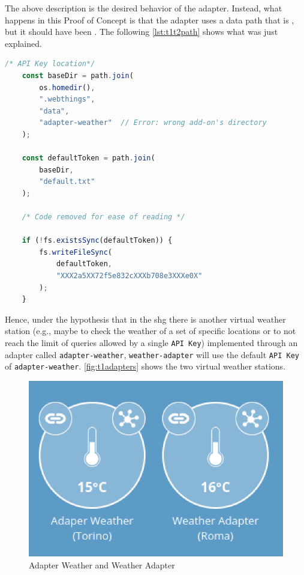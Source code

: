 The above description is the desired behavior of the adapter. Instead, what happens in this Proof of Concept is that the adapter uses a data path that is , but it should have been . The following \autoref{lst:t1t2path} shows what was just explained.

\begin{lstlisting}[language=JavaScript, label=lst:t1t2path, caption=T1 - Wrong data path]
    /* API Key location*/
    const baseDir = path.join(
        os.homedir(),
        ".webthings",
        "data",
        "adapter-weather"  // Error: wrong add-on's directory
    );
    
    const defaultToken = path.join(
        baseDir, 
        "default.txt"
    );
    
    /* Code removed for ease of reading */
    
    if (!fs.existsSync(defaultToken)) {
        fs.writeFileSync(
            defaultToken, 
            "XXX2a5XX72f5e832cXXXb708e3XXXe0X"
        );
    }
\end{lstlisting}


Hence, under the hypothesis that in the \gls{shg} there is another virtual weather station (e.g., maybe to check the weather of a set of specific locations or to not reach the limit of queries allowed by a single \texttt{API Key}) implemented through an adapter called \texttt{adapter-weather}, \texttt{weather-adapter} will use the default \texttt{API Key} of \texttt{adapter-weather}. \autoref{fig:t1adapters} shows the two virtual weather stations.

\begin{figure}[H]
    \centering
    \includegraphics[scale=0.75]{images/addons/weather.png}
    \caption{Adapter Weather and Weather Adapter}
    \label{fig:t1adapters}
\end{figure}

